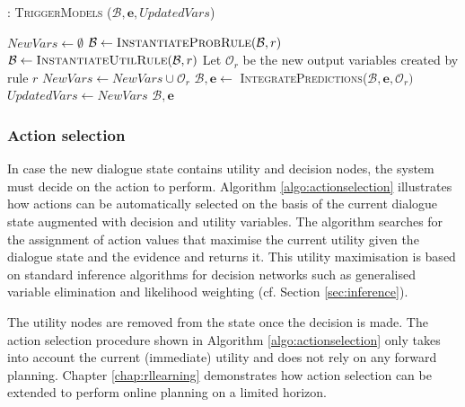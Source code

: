 \begin{algorithm}[h]
\caption{: \textsc{TriggerModels} ($\mathcal{B}, \mathbf{e}, \mathit{UpdatedVars}$)}
\begin{algorithmic}[1] \vspace{1mm}
\STATE $\mathit{NewVars} \leftarrow \emptyset$
\STATE $\mathcal{B} \leftarrow \textsc{InstantiateProbRule}(\mathcal{B},r)$
\STATE $\mathcal{B} \leftarrow \textsc{InstantiateUtilRule}(\mathcal{B},r)$
\ENDIF
\STATE Let $\mathcal{O}_r$ be the new output variables created by rule $r$
\STATE $\mathit{NewVars} \leftarrow \mathit{NewVars} \cup \mathcal{O}_r$
\STATE $\mathcal{B}, \mathbf{e} \leftarrow $ \textsc{IntegratePredictions}($\mathcal{B}, \mathbf{e}, \mathcal{O}_r)$
\ENDFOR
\ENDIF
\ENDFOR 
\STATE $\mathit{UpdatedVars} \leftarrow \mathit{NewVars}$
\ENDWHILE 
\RETURN $\mathcal{B}, \mathbf{e}$
\end{algorithmic}
\label{algo:triggerModels}
\end{algorithm}


\subsubsection*{Action selection}

In case the new dialogue state contains utility and decision nodes, the system must decide on the action to perform.  Algorithm \ref{algo:actionselection} illustrates how actions can be automatically selected on the basis of the current dialogue state augmented with decision and utility variables. The algorithm searches for the assignment of action values that maximise the current utility given the dialogue state and the evidence and returns it. This utility maximisation is based on standard inference algorithms for decision networks such as generalised variable elimination and likelihood weighting (cf. Section \ref{sec:inference}). 

The utility nodes are removed from the state once the decision is made. The action selection procedure shown in Algorithm \ref{algo:actionselection} only takes into account the current (immediate) utility and does not rely on any forward planning.  Chapter \ref{chap:rllearning} demonstrates how action selection can be extended to perform online planning on a limited horizon. 

